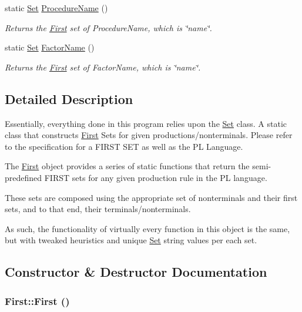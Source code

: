 \begin{DoxyCompactItemize}
static \hyperlink{classSet}{Set} \hyperlink{classFirst_a677ce3d90fae56d10823b59f73930023}{ProcedureName} ()
\begin{DoxyCompactList}\small\item\em Returns the \hyperlink{classFirst}{First} set of ProcedureName, which is \char`\"{}name\char`\"{}. \item\end{DoxyCompactList}\item 
static \hyperlink{classSet}{Set} \hyperlink{classFirst_a7cad21c19a5bee92d6721497c1182d89}{FactorName} ()
\begin{DoxyCompactList}\small\item\em Returns the \hyperlink{classFirst}{First} set of FactorName, which is \char`\"{}name\char`\"{}. \item\end{DoxyCompactList}\end{DoxyCompactItemize}


\subsection{Detailed Description}
Essentially, everything done in this program relies upon the \hyperlink{classSet}{Set} class. A static class that constructs \hyperlink{classFirst}{First} Sets for given productions/nonterminals. Please refer to the specification for a FIRST SET as well as the PL Language.

The \hyperlink{classFirst}{First} object provides a series of static functions that return the semi-\/predefined FIRST sets for any given production rule in the PL language.

These sets are composed using the appropriate set of nonterminals and their first sets, and to that end, their terminals/nonterminals.

As such, the functionality of virtually every function in this object is the same, but with tweaked heuristics and unique \hyperlink{classSet}{Set} string values per each set. 

\subsection{Constructor \& Destructor Documentation}
\hypertarget{classFirst_ab52a56e1bfd8e9de263574ef04296008}{
\subsubsection[{First}]{\setlength{\rightskip}{0pt plus 5cm}First::First ()}}
\label{classFirst_ab52a56e1bfd8e9de263574ef04296008}


